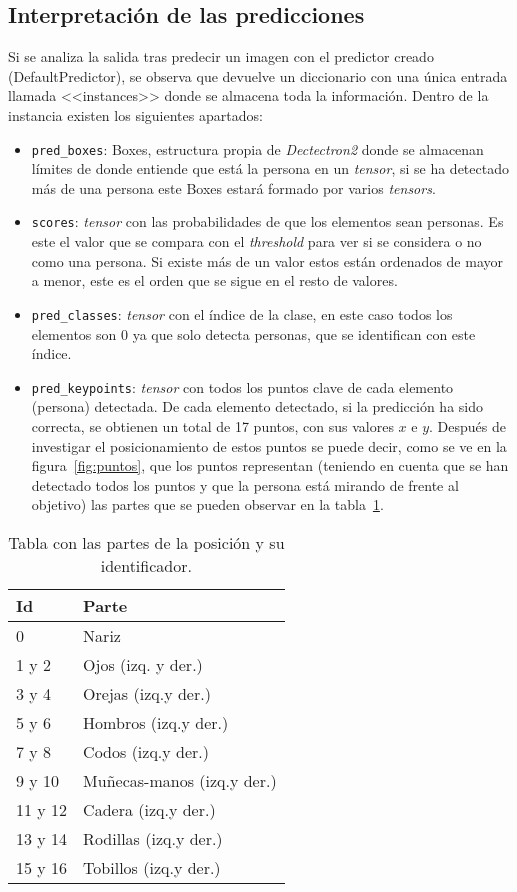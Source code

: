 {\subsection{Interpretación de las predicciones}
Si se analiza la salida tras predecir un imagen con el predictor creado (DefaultPredictor), se observa que devuelve un diccionario con una única entrada llamada <<instances>> donde se almacena toda la información. Dentro de la instancia existen los siguientes apartados:
\begin{itemize}
	\item \texttt{pred\_boxes}: Boxes, estructura propia de \textit{Dectectron2} donde se almacenan límites de donde entiende que está la persona en un \textit{tensor}, si se ha detectado más de una persona este Boxes estará formado por varios \textit{tensors}.
	\item \texttt{scores}: \textit{tensor} con las probabilidades de que los elementos sean personas. Es este el valor que se compara con el \textit{threshold} para ver si se considera o no como una persona. Si existe más de un valor estos están ordenados de mayor a menor, este es el orden que se sigue en el resto de valores.
	\item \texttt{pred\_classes}: \textit{tensor} con el índice de la clase, en este caso todos los elementos son 0 ya que solo detecta personas, que se identifican con este índice.
	\item \texttt{pred\_keypoints}: \textit{tensor} con todos los puntos clave de cada elemento (persona) detectada. De cada elemento detectado, si la predicción ha sido correcta, se obtienen un total de 17 puntos, con sus valores $x$ e $y$. Después de investigar el posicionamiento de estos puntos se puede decir, como se ve en la figura~\ref{fig:puntos}, que los puntos representan (teniendo en cuenta que se han detectado todos los puntos y que la persona está mirando de frente al objetivo) las partes que se pueden observar en la tabla~\ref{tab:partes}.
\end{itemize}

\begin{table}[h]
	\centering
	\begin{tabular}{ll}
		\toprule
		\textbf{Id} & \textbf{Parte}\\
		\midrule
		0&Nariz\\
		1 y 2&Ojos (izq. y der.)\\
		3 y 4&Orejas (izq.y der.)\\
		5 y 6&Hombros (izq.y der.)\\
		7 y 8&Codos (izq.y der.)\\
		9 y 10&Muñecas-manos (izq.y der.)\\
		11 y 12&Cadera (izq.y der.)\\
		13 y 14&Rodillas (izq.y der.)\\
		15 y 16&Tobillos (izq.y der.)\\
	\bottomrule
	\end{tabular}
\caption{Tabla con las partes de la posición y su identificador.}
\label{tab:partes}
\end{table}


}

